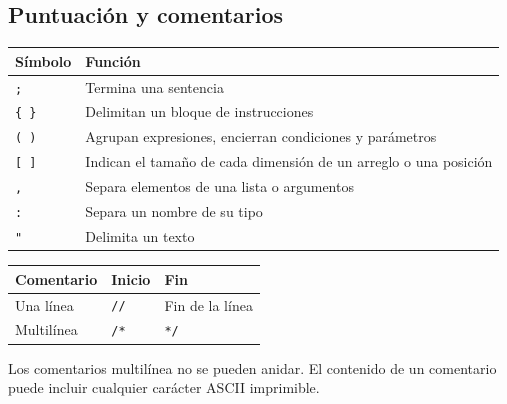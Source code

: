 \documentclass[spanish,11pt,letterpaper]{article}
\begin{document}
	\subsection{Puntuaci\'on y comentarios}
	\begin{center}
		\begin{tabular}{@{}ll@{}}
			\toprule
			\textbf{S\'imbolo} & \textbf{Funci\'on} \\
			\midrule
			\texttt{;} & Termina una sentencia \\
			\texttt{\{ \}} & Delimitan un bloque de instrucciones \\
			\texttt{( )} & Agrupan expresiones, encierran condiciones y par\'ametros \\
			\texttt{[ ]} & Indican el tamaño de cada dimensi\'on de un arreglo o una posici\'on \\
			\texttt{,} & Separa elementos de una lista o argumentos \\
			\texttt{:} & Separa un nombre de su tipo \\
			\texttt{"} & Delimita un texto \\
			\bottomrule
		\end{tabular}
	\end{center}
	
	\begin{center}
		\begin{tabular}{@{}lll@{}}
			\toprule
			\textbf{Comentario} & \textbf{Inicio} & \textbf{Fin} \\
			\midrule
			Una l\'inea & \texttt{//} & Fin de la l\'inea \\
			Multil\'inea & \texttt{/*} & \texttt{*/} \\
			\bottomrule
		\end{tabular}
	\end{center}
	
	Los comentarios multil\'inea no se pueden anidar. El contenido de un
	comentario puede incluir cualquier car\'acter ASCII imprimible.
	
\end{document}
